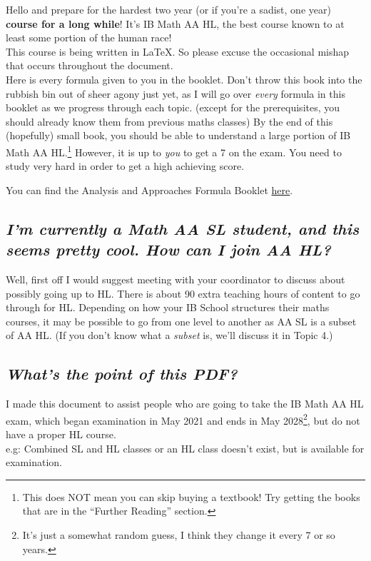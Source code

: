 \documentclass[main.tex]{subfiles}
\begin{document}
\hbox{} Hello and prepare for the hardest two year (or if you're a sadist, one year) \textbf{course for a long while}! It's IB Math AA HL, the best course known to at least some portion of the human race!\\ This course is being written in \LaTeX. So please excuse the occasional mishap that occurs throughout the document.\\
Here is every formula given to you in the booklet. Don't throw this book into the rubbish bin out of sheer agony just yet, as I will go over \textsl{every} formula in this booklet as we progress through each topic. (except for the prerequisites, you should already know them from previous maths classes) By the end of this (hopefully) small book, you should be able to understand a large portion of IB Math AA HL.\footnote{This does NOT mean you can skip buying a textbook! Try getting the books that are in the ``Further Reading'' section.} However, it is up to \textsl{you} to get a 7 on the exam. You need to study very hard in order to get a high achieving score.\\

\begin{center}
 You can find the Analysis and Approaches Formula Booklet \href{https://bit.ly/maaformulabooklet}{here}.\\
\end{center}
\subsection*{\textsl{I'm currently a Math AA SL student, and this seems pretty cool. How can I join AA HL?}}

Well, first off I would suggest meeting with your coordinator to discuss about possibly going up to HL. There is about 90 extra teaching hours of content to go through for HL. Depending on how your IB School structures their maths courses, it may be possible to go from one level to another as AA SL is a subset of AA HL. (If you don't know what a \textsl{subset} is, we'll discuss it in Topic 4.) 

\subsection*{\textsl{What's the point of this PDF?}}

I made this document to assist people who are going to take the IB Math AA HL exam, which began examination in May 2021 and ends in May 2028\footnote{It's just a somewhat random guess, I think they change it every 7 or so years.}, but do not have a proper HL course.\\
e.g:  Combined SL and HL classes or an HL class doesn't exist, but is available for examination.
\newpage
\end{document}
